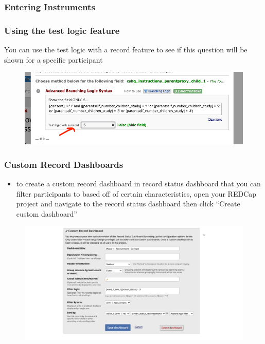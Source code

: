 \documentclass[]{book}
\providecommand{\tightlist}{%
  \setlength{\itemsep}{0pt}\setlength{\parskip}{0pt}}
\begin{document}
\hypertarget{entering-instruments}{%
\subsubsection{Entering Instruments}\label{entering-instruments}}

\hypertarget{using-the-test-logic-feature}{%
\subsubsection{Using the test logic feature}\label{using-the-test-logic-feature}}

You can use the test logic with a record feature to see if this question will be shown for a specific participant

\begin{figure}
\centering
\includegraphics{images/lab_protocols/redcap/1.png}
\caption{}
\end{figure}

\hypertarget{custom-record-dashboards}{%
\subsubsection{Custom Record Dashboards}\label{custom-record-dashboards}}

\begin{itemize}
\tightlist
\item
  to create a custom record dashboard in record status dashboard that you can filter participants to based off of certain characteristics, open your REDCap project and navigate to the record status dashboard then click ``Create custom dashboard''
\end{itemize}

\begin{figure}
\centering
\includegraphics{images/lab_protocols/redcap/5.png}
\caption{}
\end{figure}
\end{document}
